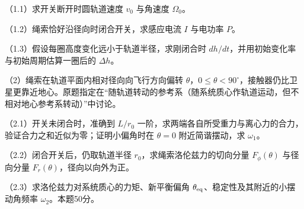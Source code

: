 \documentclass[12pt,a4paper,fontset=fandol]{ctexart}
\begin{document}
（1.1）求开关断开时圆轨道速度 \(v_0\) 与角速度 \(\Omega_0\)。

（1.2）绳索恰好沿径向时闭合开关，求感应电流 \(I\) 与电功率 \(P\)。

（1.3）假设每圈高度变化远小于轨道半径，求刚闭合时
\(dh/dt\)，并用初始变化率与初始周期估算一圈后的 \(\Delta h\)。

（2）绳索在轨道平面内相对径向向飞行方向偏转
\(\theta\)，\(0\le\theta<90^\circ\)，接触器仍比卫星更靠近地心。原题指定在``随轨道转动的参考系（随系统质心作轨道运动，但不相对地心参考系转动）''中讨论。

（2.1）开关未闭合时，准确到 \(L/r_0\)
一阶，求两端各自所受重力与离心力的合力，验证合力之和近似为零；证明小偏角时在
\(\theta=0\) 附近简谐摆动，求 \(\omega_1\)。

（2.2）闭合开关后，仍取轨道半径 \(r_0\)，求绳索洛伦兹力的切向分量
\(F_\phi(\theta)\) 与径向分量 \(F_r(\theta)\)，径向以向外为正。

（2.3）求洛伦兹力对系统质心的力矩、新平衡偏角
\(\theta_{\rm eq}\)、稳定性及其附近的小摆动角频率
\(\omega_2\)。本题50分。

\begin{center}
\begin{minipage}{\linewidth}
\centering\begingroup
{}
\ifdim\wd\diagrambox>.88\linewidth
\sbox{\diagrambox}{\resizebox{.88\linewidth}{!}{\usebox{\diagrambox}}}
\fi
\ifdim\ht\diagrambox>.29\textheight
\resizebox{!}{.29\textheight}{\usebox{\diagrambox}}
\else\usebox{\diagrambox}\fi
\par{}
\endgroup\end{minipage}
\end{center}
\end{document}
